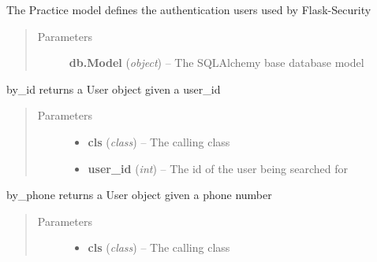 \documentclass[letterpaper,10pt,english]{sphinxmanual}
\begin{document}
\begin{fulllineitems}
\label{dev-practices:cagenix.practices.models.Practice}
The Practice model defines the authentication users used by Flask-Security
\begin{quote}\begin{description}
\item[{Parameters}] \leavevmode
\textbf{db.Model} (\emph{object}) -- The SQLAlchemy base database model

\end{description}\end{quote}

\begin{fulllineitems}
\label{dev-practices:cagenix.practices.models.Practice.by_id}
by\_id returns a User object given a user\_id
\begin{quote}\begin{description}
\item[{Parameters}] \leavevmode\begin{itemize}
\item {} 
\textbf{cls} (\emph{class}) -- The calling class

\item {} 
\textbf{user\_id} (\emph{int}) -- The id of the user being searched for

\end{itemize}

\end{description}\end{quote}

\end{fulllineitems}


\begin{fulllineitems}
\label{dev-practices:cagenix.practices.models.Practice.by_phone}
by\_phone returns a User object given a phone number
\begin{quote}\begin{description}
\item[{Parameters}] \leavevmode\begin{itemize}
\item {} 
\textbf{cls} (\emph{class}) -- The calling class


\end{itemize}
\end{description}
\end{quote}
\end{fulllineitems}
\end{fulllineitems}
\end{document}
